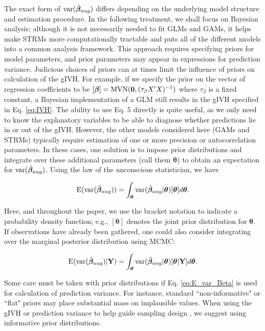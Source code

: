 \documentclass[12pt,english]{article}
\begin{document}
\begin{spacing}{1.9}
The exact form of ${\rm var}(\hat{\boldsymbol{\beta}}_{aug})$ differs depending on the underlying model structure and estimation procedure.  In the following treatment, we shall focus on Bayesian analysis; although it is not necessarily needed to fit GLMs and GAMs, it helps make STRMs more computationally tractable and puts all of the different models into a common analysis framework.  This approach requires specifying priors for model parameters, and prior parameters may appear in expressions for prediction variance.  Judicious choices of priors can at times limit the influence of priors on calculation of the gIVH.  For example, if we specify the prior on the vector of regression coefficients to be $[\boldsymbol{\beta}] = \textrm{MVN}({\bf 0},(\tau_\beta X^\prime X)^{-1})$ where $\tau_\beta$ is a fixed constant, a Bayesian implementation of a GLM still results in the gIVH specified in Eq. \ref{eq:IVH}.  The ability to use Eq. 5 directly is quite useful, as we only need to know the explanatory variables to be able to diagnose whether predictions lie in or out of the gIVH. However, the other models considered here (GAMs and STRMs) typically require estimation of one or more precision or autocorrelation parameters.   In these cases, one solution is to impose prior distributions and integrate over these additional parameters (call them $\boldsymbol{\theta}$) to obtain an expectation for ${\rm var}(\hat{\boldsymbol{\beta}}_{aug})$.  Using the law of the unconscious statistician, we have
\begin{linenomath*}
\begin{equation}
  \label{eq:E_var_Beta}
  {\rm E}({\rm var}(\hat{\boldsymbol{\beta}}_{aug}))  = \int_{\boldsymbol{\theta}} {\rm var}(\hat{\boldsymbol{\beta}}_{aug}|\boldsymbol{\theta}) [\boldsymbol{\theta}] d \boldsymbol{\theta}.
\end{equation}
\end{linenomath*}
Here, and throughout the paper, we use the bracket notation to indicate a probability density function; e.g., $[\boldsymbol{\theta}] $ denotes the joint prior distribution for $\boldsymbol{\theta}$. If observations have already been gathered, one could also consider integrating over the marginal posterior distribution using MCMC:
\begin{linenomath*}
\begin{equation}
  \label{eq:E_var_Beta_post}
  {\rm E}({\rm var}(\hat{\boldsymbol{\beta}}_{aug}) | {\bf Y})  = \int_{\boldsymbol{\theta}} {\rm var}(\hat{\boldsymbol{\beta}}_{aug}|\boldsymbol{\theta}) [\boldsymbol{\theta}| {\bf Y}] d \boldsymbol{\theta}.
\end{equation}
\end{linenomath*}
Some care must be taken with prior distributions if Eq. \ref{eq:E_var_Beta} is used for calculation of prediction variance.  For instance, standard ``non-informative" or ``flat" priors may place substantial mass on implausible values.  When using the gIVH or prediction variance to help guide sampling design \citep[see][for an example using prediction variance]{DiggleLophaven2006}, we suggest using informative prior distributions.


\end{spacing}
\end{document}
